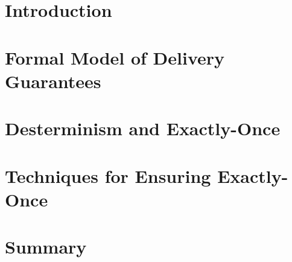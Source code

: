 \section{Introduction}


\section{Formal Model of Delivery Guarantees}
\label{fs-formalism}


\section{Desterminism and Exactly-Once}
\label{fs-determinism-eo}


\section{Techniques for Ensuring Exactly-Once}
\label{fs-eo-impl}


\section{Summary}
\label{fs-conclusion-seciton}
